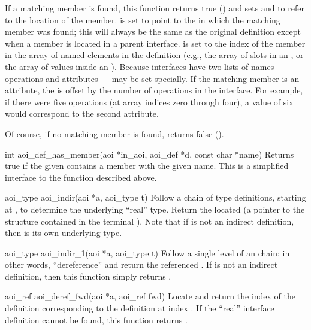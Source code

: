 \begin{cprototypelist}
  If a matching member is found, this function returns true () and
  sets  and  to refer to the
  location of the member.   is set to point to the
   in which the matching member was found; this will always be
  the same as the original definition except when a member is located in a
  parent interface.   is set to the index of the
  member in the array of named elements in the definition (e.g., the array of
  slots in an , or the array of values inside an
  ).  Because interfaces have two lists of names --- operations
  and attributes ---  may be set specially.  If the
  matching member is an attribute, the  is offset by
  the number of operations in the interface.  For example, if there were five
  operations (at array indices zero through four), a
   value of six would correspond to the second
  attribute.

  Of course, if no matching member is found, 
  returns false ().

  \item[int aoi_def_has_member(aoi *in_aoi, aoi_def *d, const char *name)]
  Returns true if the given  contains a member with the given
  name.  This is a simplified interface to the 
  function described above.

  \item[aoi_type aoi_indir(aoi *a, aoi_type t)]
  Follow a chain of  type definitions, starting at
  , to determine the underlying ``real'' type.  Return the
  located  (a pointer to the  structure
  contained in the terminal ).  Note that if  is
  not an indirect definition, then  is its own underlying type.

  \item[aoi_type aoi_indir_1(aoi *a, aoi_type t)]
  Follow a single level of an  chain; in other words,
  ``dereference''  and return the referenced .
  If  is not an indirect definition, then this function simply
  returns .

  \item[aoi_ref aoi_deref_fwd(aoi *a, aoi_ref fwd)]
  Locate and return the index of the  definition
  corresponding to the  definition at \AOI{} index
  .  If the ``real'' interface definition cannot be found,
  this function returns .


\end{cprototypelist}
